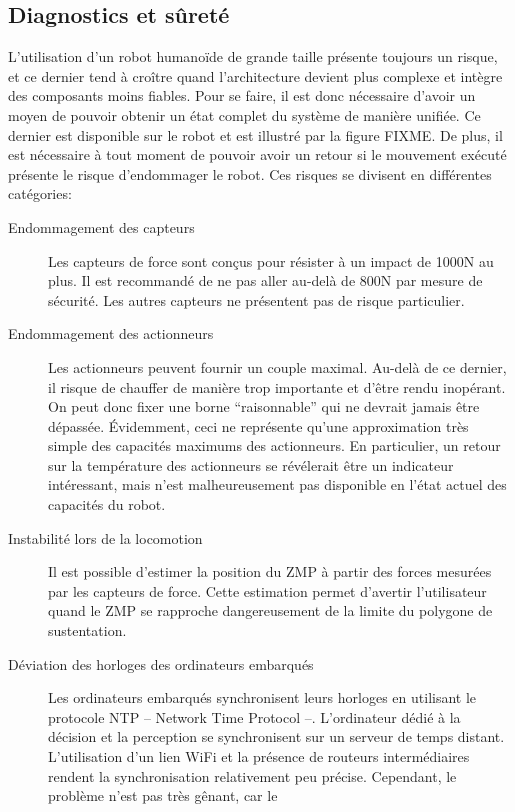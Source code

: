 \subsection{Diagnostics et sûreté}

L'utilisation d'un robot humanoïde de grande taille présente toujours
un risque, et ce dernier tend à croître quand l'architecture devient
plus complexe et intègre des composants moins fiables. Pour se faire,
il est donc nécessaire d'avoir un moyen de pouvoir obtenir un état
complet du système de manière unifiée. Ce dernier est disponible sur
le robot et est illustré par la figure FIXME. De plus, il est
nécessaire à tout moment de pouvoir avoir un retour si le mouvement
exécuté présente le risque d'endommager le robot. Ces risques se
divisent en différentes catégories:
\begin{description}
\item[Endommagement des capteurs] Les capteurs de force sont conçus
  pour résister à un impact de 1000N au plus. Il est recommandé de ne
  pas aller au-delà de 800N par mesure de sécurité. Les autres
  capteurs ne présentent pas de risque particulier.
\item[Endommagement des actionneurs] Les actionneurs peuvent fournir
  un couple maximal. Au-delà de ce dernier, il risque de chauffer de
  manière trop importante et d'être rendu inopérant. On peut donc
  fixer une borne ``raisonnable'' qui ne devrait jamais être
  dépassée. Évidemment, ceci ne représente qu'une approximation très
  simple des capacités maximums des actionneurs. En particulier, un
  retour sur la température des actionneurs se révélerait être un
  indicateur intéressant, mais n'est malheureusement pas disponible en
  l'état actuel des capacités du robot.
\item[Instabilité lors de la locomotion] Il est possible d'estimer la
  position du ZMP à partir des forces mesurées par les capteurs de
  force. Cette estimation permet d'avertir l'utilisateur quand le ZMP
  se rapproche dangereusement de la limite du polygone de
  sustentation.
\item[Déviation des horloges des ordinateurs embarqués] Les
  ordinateurs embarqués synchronisent leurs horloges en utilisant le
  protocole NTP -- Network Time Protocol --. L'ordinateur dédié à la
  décision et la perception se synchronisent sur un serveur de temps
  distant. L'utilisation d'un lien WiFi et la présence de routeurs
  intermédiaires rendent la synchronisation relativement peu
  précise. Cependant, le problème n'est pas très gênant, car le

\end{description}
